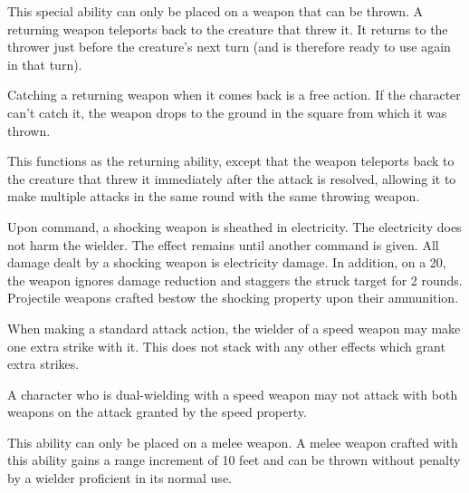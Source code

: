 
 This special ability can only be placed on a weapon that can be thrown. A returning weapon teleports back to the creature that threw it. It returns to the thrower just before the creature's next turn (and is therefore ready to use again in that turn).

Catching a returning weapon when it comes back is a free action. If the character can't catch it, the weapon drops to the ground in the square from which it was thrown.


 This functions as the returning ability, except that the weapon teleports back to the creature that threw it immediately after the attack is resolved, allowing it to make multiple attacks in the same round with the same throwing weapon.


 Upon command, a shocking weapon is sheathed in electricity. The electricity does not harm the wielder. The effect remains until another command is given. All damage dealt by a shocking weapon is electricity damage. In addition, on a 20, the weapon ignores damage reduction and staggers the struck target for 2 rounds. Projectile weapons crafted bestow the shocking property upon their ammunition.


 When making a standard attack action, the wielder of a speed weapon may make one extra strike with it.
This does not stack with any other effects which grant extra strikes.

A character who is dual-wielding with a speed weapon may not attack with both weapons on the attack granted by the speed property.


 This ability can only be placed on a melee weapon. A melee weapon crafted with this ability gains a range increment of 10 feet and can be thrown without penalty by a wielder proficient in its normal use.

